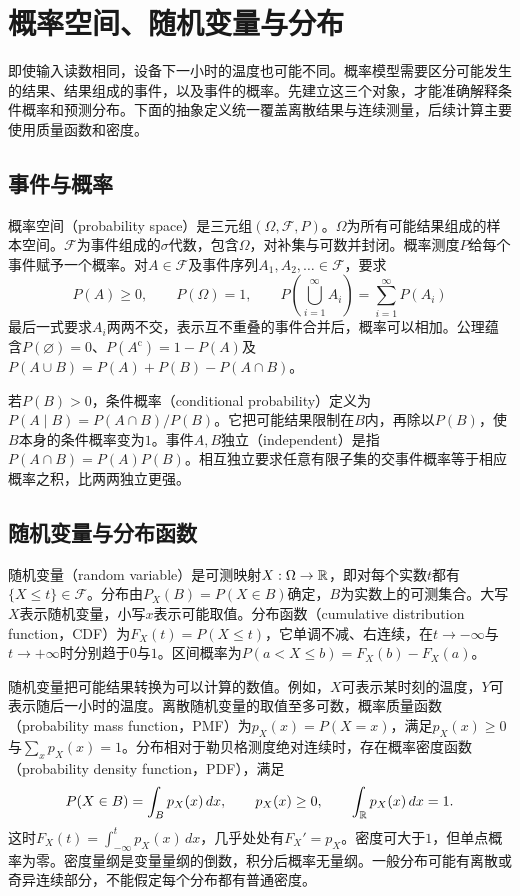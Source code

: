 \section{概率空间、随机变量与分布}
即使输入读数相同，设备下一小时的温度也可能不同。概率模型需要区分可能发生的结果、结果组成的事件，以及事件的概率。先建立这三个对象，才能准确解释条件概率和预测分布。下面的抽象定义统一覆盖离散结果与连续测量，后续计算主要使用质量函数和密度。

\subsection{事件与概率}
概率空间（probability space）是三元组$(\Omega,\mathcal F,P)$。$\Omega$为所有可能结果组成的样本空间。$\mathcal F$为事件组成的$\sigma$代数，包含$\Omega$，对补集与可数并封闭。概率测度$P$给每个事件赋予一个概率。对$A\in\mathcal F$及事件序列$A_1,A_2,\ldots\in\mathcal F$，要求
\begin{equation}
 P(A)\geq0,\qquad P(\Omega)=1,\qquad
 P\left(\bigcup_{i=1}^\infty A_i\right)=\sum_{i=1}^\infty P(A_i)
\end{equation}
最后一式要求$A_i$两两不交，表示互不重叠的事件合并后，概率可以相加。公理蕴含$P(\varnothing)=0$、$P(A^{\mathrm c})=1-P(A)$及$P(A\cup B)=P(A)+P(B)-P(A\cap B)$。

若$P(B)>0$，条件概率（conditional probability）定义为$P(A\mid B)=P(A\cap B)/P(B)$。它把可能结果限制在$B$内，再除以$P(B)$，使$B$本身的条件概率变为$1$。事件$A,B$独立（independent）是指$P(A\cap B)=P(A)P(B)$。相互独立要求任意有限子集的交事件概率等于相应概率之积，比两两独立更强。

\subsection{随机变量与分布函数}
随机变量（random variable）是可测映射$X:\Omega\to\mathbb{R}$，即对每个实数$t$都有$\{X\leq t\}\in\mathcal F$。分布由$P_X(B)=P(X\in B)$确定，$B$为实数上的可测集合。大写$X$表示随机变量，小写$x$表示可能取值。分布函数（cumulative distribution function，CDF）为$F_X(t)=P(X\leq t)$，它单调不减、右连续，在$t\to-\infty$与$t\to+\infty$时分别趋于$0$与$1$。区间概率为$P(a<X\leq b)=F_X(b)-F_X(a)$。

随机变量把可能结果转换为可以计算的数值。例如，$X$可表示某时刻的温度，$Y$可表示随后一小时的温度。离散随机变量的取值至多可数，概率质量函数（probability mass function，PMF）为$p_X(x)=P(X=x)$，满足$p_X(x)\geq0$与$\sum_xp_X(x)=1$。分布相对于勒贝格测度绝对连续时，存在概率密度函数（probability density function，PDF），满足
\begin{equation}
 P(X\in B)=\int_Bp_X(x)\,dx,\qquad p_X(x)\geq0,\qquad\int_{\mathbb{R}}p_X(x)\,dx=1.
\end{equation}
这时$F_X(t)=\int_{-\infty}^t p_X(x)\,dx$，几乎处处有$F_X'=p_X$。密度可大于$1$，但单点概率为零。密度量纲是变量量纲的倒数，积分后概率无量纲。一般分布可能有离散或奇异连续部分，不能假定每个分布都有普通密度。

